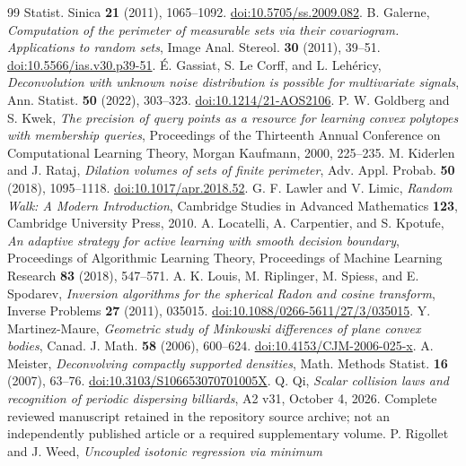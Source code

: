 \begin{thebibliography}{99}
Statist. Sinica \textbf{21} (2011), 1065--1092.
\href{https://doi.org/10.5705/ss.2009.082}{doi:10.5705/ss.2009.082}.
B. Galerne, \emph{Computation of the perimeter of measurable sets via
their covariogram. Applications to random sets},
Image Anal. Stereol. \textbf{30} (2011), 39--51.
\href{https://doi.org/10.5566/ias.v30.p39-51}
{doi:10.5566/ias.v30.p39-51}.
\'E. Gassiat, S. Le Corff, and L. Leh\'ericy,
\emph{Deconvolution with unknown noise distribution is possible for multivariate
signals}, Ann. Statist. \textbf{50} (2022), 303--323.
\href{https://doi.org/10.1214/21-AOS2106}{doi:10.1214/21-AOS2106}.
P. W. Goldberg and S. Kwek,
\emph{The precision of query points as a resource for learning convex
polytopes with membership queries},
Proceedings of the Thirteenth Annual Conference on Computational
Learning Theory, Morgan Kaufmann, 2000, 225--235.
M. Kiderlen and J. Rataj, \emph{Dilation volumes of sets of finite perimeter},
Adv. Appl. Probab. \textbf{50} (2018), 1095--1118.
\href{https://doi.org/10.1017/apr.2018.52}{doi:10.1017/apr.2018.52}.
G. F. Lawler and V. Limic, \emph{Random Walk: A Modern Introduction},
Cambridge Studies in Advanced Mathematics \textbf{123}, Cambridge
University Press, 2010.
A. Locatelli, A. Carpentier, and S. Kpotufe,
\emph{An adaptive strategy for active learning with smooth decision boundary},
Proceedings of Algorithmic Learning Theory, Proceedings of Machine
Learning Research \textbf{83} (2018), 547--571.
A. K. Louis, M. Riplinger, M. Spiess, and E. Spodarev,
\emph{Inversion algorithms for the spherical Radon and cosine transform},
Inverse Problems \textbf{27} (2011), 035015.
\href{https://doi.org/10.1088/0266-5611/27/3/035015}
{doi:10.1088/0266-5611/27/3/035015}.
Y. Martinez-Maure, \emph{Geometric study of Minkowski differences of
plane convex bodies}, Canad. J. Math. \textbf{58} (2006), 600--624.
\href{https://doi.org/10.4153/CJM-2006-025-x}{doi:10.4153/CJM-2006-025-x}.
A. Meister, \emph{Deconvolving compactly supported densities},
Math. Methods Statist. \textbf{16} (2007), 63--76.
\href{https://doi.org/10.3103/S106653070701005X}{doi:10.3103/S106653070701005X}.
Q. Qi, \emph{Scalar collision laws and recognition of periodic dispersing
billiards}, A2 v31, October 4, 2026. Complete reviewed manuscript retained in the repository source archive;
not an independently published article or a required supplementary volume.
P. Rigollet and J. Weed, \emph{Uncoupled isotonic regression via minimum
}
\end{thebibliography}
